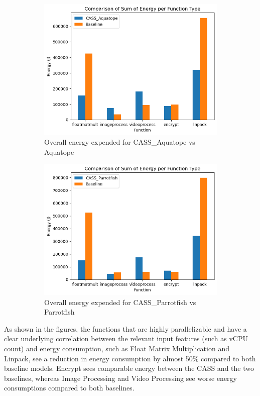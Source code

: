 \documentclass[times, 10pt,twocolumn]{article}
\begin{document}
\begin{figure}[H] %
   \centering
   \begin{subfigure}[b]{0.5\textwidth} %
         \centering
         \includegraphics[width=0.6\linewidth]{imgs/final_experiment_plots/energy_comparison/aquatope/overall.png}
         \caption{Overall energy expended for CASS\_Aquatope vs Aquatope}
         \label{fig:cassvsaquatope_energy}
   \end{subfigure}
   \begin{subfigure}[b]{0.5\textwidth} %
         \centering
         \includegraphics[width=0.6\linewidth]{imgs/final_experiment_plots/energy_comparison/parrotfish/overall.png}
         \caption{Overall energy expended for CASS\_Parrotfish vs Parrotfish}
         \label{fig:cassvsparrotfish_energy}
   \end{subfigure}
   \caption{}
\end{figure}

As shown in the figures, the functions that are highly parallelizable and have a clear underlying correlation between the relevant input features (such as vCPU count) and energy consumption, such as Float Matrix Multiplication and Linpack, see a reduction in energy consumption by almost 50\% compared to both baseline models. Encrypt sees comparable energy between the CASS and the two baselines, whereas Image Processing and Video Processing see worse energy consumptions compared to both baselines.
\end{document}

